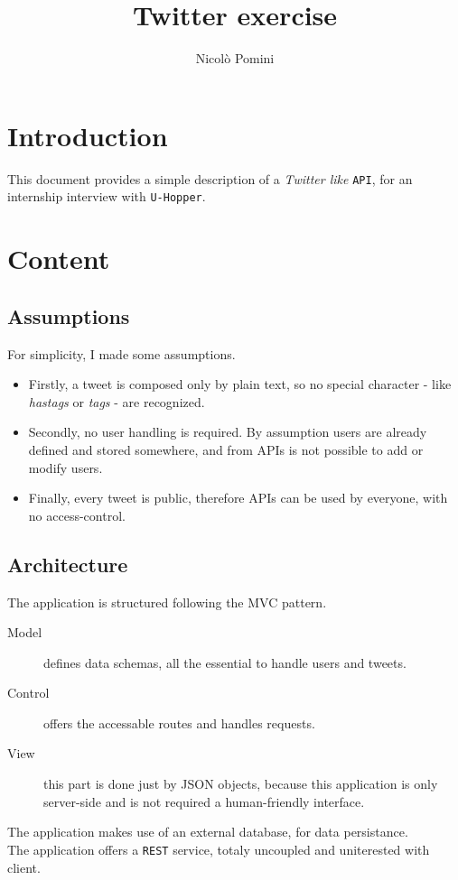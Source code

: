 \documentclass[a4paper]{article}
\begin{document}
\author{Nicolò Pomini}
\title{Twitter exercise}
\maketitle

\tableofcontents

\section{Introduction}
This document provides a simple description of a \textit{Twitter like} \texttt{API}, for an internship interview with \texttt{U-Hopper}.

\section{Content}
\subsection{Assumptions}
For simplicity, I made some assumptions.\\
\begin{itemize}
\item Firstly, a tweet is composed only by plain text, so no special character - like \textit{hastags} or \textit{tags} - are recognized.
\item Secondly, no user handling is required. By assumption users are already defined and stored somewhere, and from APIs is not possible to add or modify users.
\item Finally, every tweet is public, therefore APIs can be used by everyone, with no access-control.
\end{itemize}

\subsection{Architecture}
The application is structured following the MVC pattern.
\begin{description}
\item[Model] defines data schemas, all the essential to handle users and tweets.
\item[Control] offers the accessable routes and handles requests.
\item[View] this part is done just by JSON objects, because this application is only server-side and is not required a human-friendly interface.
\end{description}
The application makes use of an external database, for data persistance.\\
The application offers a \texttt{REST} service, totaly uncoupled and uniterested with client.
\end{document}
